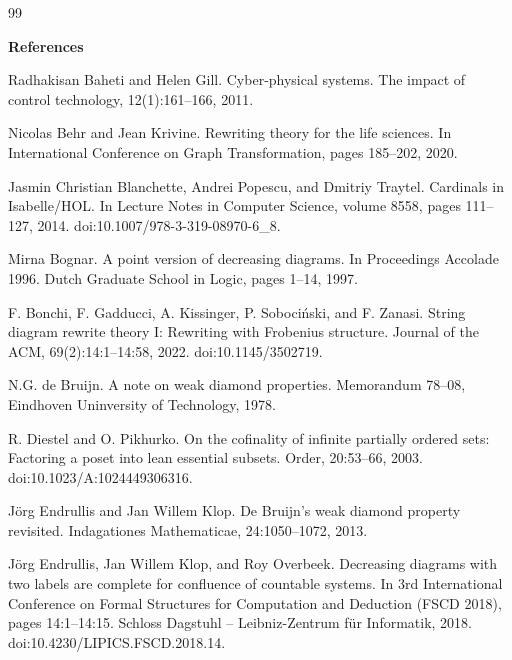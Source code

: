 \documentclass[10pt,a4paper]{amsart}
\begin{document}
\begin{thebibliography}{99}

 
\par\medskip\noindent\textbf{References}\par
  
\par\noindent  [1]  Radhakisan Baheti and Helen Gill.  Cyber-physical systems.  The impact of control technology, 12(1):161–166, 2011.  
 
\par\noindent  [2]  Nicolas Behr and Jean Krivine.  Rewriting theory for the life sciences.  In International Conference on Graph Transformation, pages 185–202, 2020.  
 
\par\noindent  [3]  Jasmin Christian Blanchette, Andrei Popescu, and Dmitriy Traytel.  Cardinals in Isabelle/HOL.  In Lecture Notes in Computer Science, volume 8558, pages 111–127, 2014.  doi:10.1007/978-3-319-08970-6\_8.  
 
\par\noindent  [4]  Mirna Bognar.  A point version of decreasing diagrams.  In Proceedings Accolade 1996. Dutch Graduate School in Logic, pages 1–14, 1997.  
 
\par\noindent  [5]  F. Bonchi, F. Gadducci, A. Kissinger, P. Sobociński, and F. Zanasi.  String diagram rewrite theory I: Rewriting with Frobenius structure.  Journal of the ACM, 69(2):14:1–14:58, 2022.  doi:10.1145/3502719.  
 
\par\noindent  [6]  N.G. de Bruijn.  A note on weak diamond properties.  Memorandum 78–08, Eindhoven Uninversity of Technology, 1978.  
 
\par\noindent  [7]  R. Diestel and O. Pikhurko.  On the cofinality of infinite partially ordered sets: Factoring a poset into lean essential subsets.  Order, 20:53–66, 2003.  doi:10.1023/A:1024449306316.  
 
\par\noindent  [8]  Jörg Endrullis and Jan Willem Klop.  De Bruijn’s weak diamond property revisited.  Indagationes Mathematicae, 24:1050–1072, 2013.  
 
\par\noindent  [9]  Jörg Endrullis, Jan Willem Klop, and Roy Overbeek.  Decreasing diagrams with two labels are complete for confluence of countable systems.  In 3rd International Conference on Formal Structures for Computation and Deduction (FSCD 2018), pages 14:1–14:15. Schloss Dagstuhl – Leibniz-Zentrum für Informatik, 2018.  doi:10.4230/LIPICS.FSCD.2018.14.  
 

\end{thebibliography}
\end{document}
